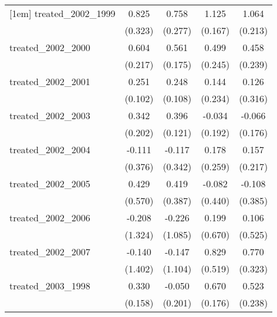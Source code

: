 {\begin{tabular}{l*{4}{c}}
[1em]
treated\_2002\_1999&       0.825\sym{*}  &       0.758\sym{**} &       1.125\sym{***}&       1.064\sym{***}\\
            &     (0.323)         &     (0.277)         &     (0.167)         &     (0.213)         \\
[1em]
treated\_2002\_2000&       0.604\sym{**} &       0.561\sym{**} &       0.499\sym{*}  &       0.458         \\
            &     (0.217)         &     (0.175)         &     (0.245)         &     (0.239)         \\
[1em]
treated\_2002\_2001&       0.251\sym{*}  &       0.248\sym{*}  &       0.144         &       0.126         \\
            &     (0.102)         &     (0.108)         &     (0.234)         &     (0.316)         \\
[1em]
treated\_2002\_2003&       0.342         &       0.396\sym{**} &      -0.034         &      -0.066         \\
            &     (0.202)         &     (0.121)         &     (0.192)         &     (0.176)         \\
[1em]
treated\_2002\_2004&      -0.111         &      -0.117         &       0.178         &       0.157         \\
            &     (0.376)         &     (0.342)         &     (0.259)         &     (0.217)         \\
[1em]
treated\_2002\_2005&       0.429         &       0.419         &      -0.082         &      -0.108         \\
            &     (0.570)         &     (0.387)         &     (0.440)         &     (0.385)         \\
[1em]
treated\_2002\_2006&      -0.208         &      -0.226         &       0.199         &       0.106         \\
            &     (1.324)         &     (1.085)         &     (0.670)         &     (0.525)         \\
[1em]
treated\_2002\_2007&      -0.140         &      -0.147         &       0.829         &       0.770\sym{*}  \\
            &     (1.402)         &     (1.104)         &     (0.519)         &     (0.323)         \\
[1em]
treated\_2003\_1998&       0.330\sym{*}  &      -0.050         &       0.670\sym{***}&       0.523\sym{*}  \\
            &     (0.158)         &     (0.201)         &     (0.176)         &     (0.238)         \\

\end{tabular}}
